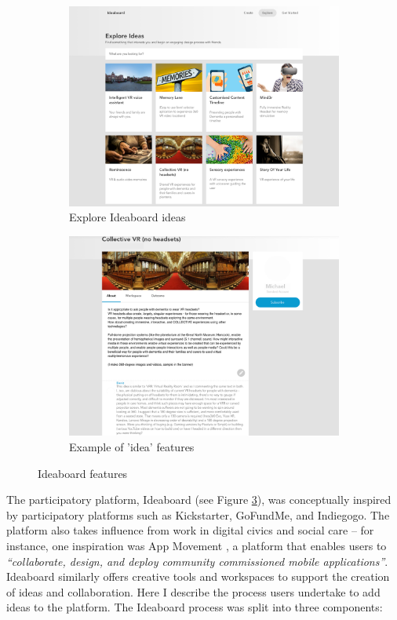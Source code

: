 \begin{figure}[htp]
\centering
\begin{subfigure}{.5\textwidth}
  \centering
  \includegraphics[width=.8\linewidth]{Images/DemVR/Ideaboard Ideas.png}
  \caption{Explore Ideaboard ideas}
  \label{fig:exploreIdeaboard}
\end{subfigure}%
\begin{subfigure}{.5\textwidth}
  \centering
  \includegraphics[width=.8\linewidth]{Images/DemVR/Example of idea.png}
  \caption{Example of 'idea' features}
  \label{fig:IdeaboardIdea}
\end{subfigure}
\caption{Ideaboard features}
\label{fig:IdeaboardFeatures}
\end{figure}

The participatory platform, Ideaboard (see Figure \ref{fig:IdeaboardFeatures}), was conceptually inspired by participatory platforms such as Kickstarter, GoFundMe, and Indiegogo. The platform also takes influence from work in digital civics and social care – for instance, one inspiration was App Movement \citep{garbett_app_2016}, a platform that enables users to \textit{``collaborate, design, and deploy community commissioned mobile applications''}. Ideaboard similarly offers creative tools and workspaces to support the creation of ideas and collaboration. Here I describe the process users undertake to add ideas to the platform. The Ideaboard process was split into three components:

